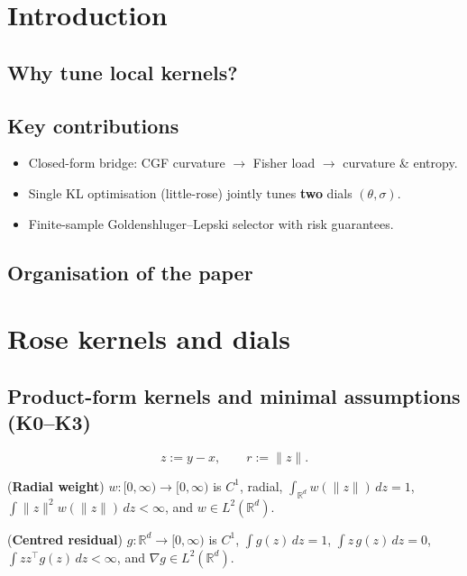 \documentclass{article}
\newcommand{\R}{\mathbb{R}}
\theoremstyle{plain}
\theoremstyle{definition}
\theoremstyle{remark}
\begin{document}
\section{Introduction}
  \subsection{Why tune local kernels?}
  \subsection{Key contributions}
    \begin{itemize}[leftmargin=*,nosep]
    \item Closed-form bridge: CGF curvature $\to$ Fisher load $\to$ curvature \& entropy.
    \item Single KL optimisation (little-rose) jointly tunes \textbf{two} dials $(\theta,\sigma)$.
    \item Finite-sample Goldenshluger–Lepski selector with risk guarantees.
    \end{itemize}
  \subsection{Organisation of the paper}

\section{Rose kernels and dials}

 
 	\subsection{Product-form kernels and minimal assumptions (K0–K3)}
	
	\[
   		z := y-x,  \qquad r := \|z\|.
	\]

	\begin{assumptionlist}[label=(W\arabic*)]
		\item \label{W1}(\textbf{Radial weight}) $w:[0,\infty)\to[0,\infty)$ is $C^{1}$, radial, $\int_{\R^{d}} w(\|z\|)\,dz = 1$,  $\int\|z\|^{2} w(\|z\|)\,dz < \infty$, and $w\in L^{2}(\R^{d})$.

		\item \label{W2} (\textbf{Centred residual}) $g:\R^{d}\to[0,\infty)$ is $C^{1}$,  $\int g(z)\,dz = 1$,  $\int z\,g(z)\,dz = 0$, $\int zz^{\top} g(z)\,dz < \infty$,  and $\nabla g\in L^{2}(\R^{d})$.
	\end{assumptionlist}
	
\end{document}
